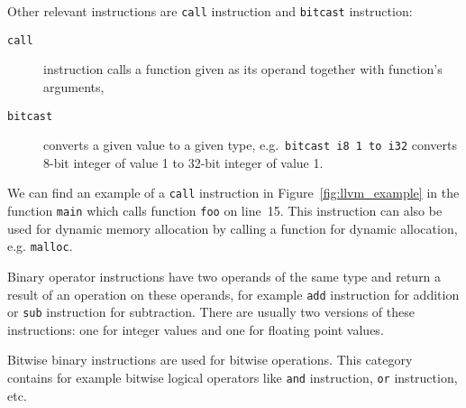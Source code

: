 Other relevant instructions are \texttt{call} instruction and \texttt{bitcast}
instruction:
\begin{description}
\item[\texttt{call}] instruction calls a function given as its
operand together with function's arguments,
\item[\texttt{bitcast}] converts a given value to a given type, e.g.~\texttt{bitcast i8 1 to
i32} converts 8-bit integer of value 1 to 32-bit integer of value 1.
\end{description}
 We can find an example of a \texttt{call} instruction in
 Figure~\ref{fig:llvm_example} in the function \texttt{main} which calls
 function \texttt{foo} on line~15. This instruction can also be used for
 dynamic memory allocation by calling a function for dynamic allocation, e.g.
 \texttt{malloc}.

Binary operator instructions have two operands of the same type and return a
result of an operation on these operands, for example \texttt{add} instruction
for addition or \texttt{sub} instruction for subtraction. There are usually two
versions of these instructions: one for integer values and one for floating
point values.

Bitwise binary instructions are used for bitwise operations. This category
contains for example bitwise logical operators like \texttt{and} instruction,
\texttt{or} instruction, etc.


